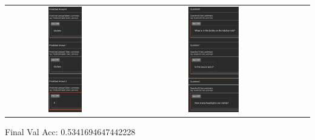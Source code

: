 \documentclass{article}
\begin{document}
\begin{tabular}{ccc}
    \includegraphics[width=0.3\textwidth]{q2.6_21.png} &
    \includegraphics[width=0.3\textwidth]{q2.6_22.png} \\
\end{tabular}

Final Val Acc: 0.5341694647442228
\end{document}
